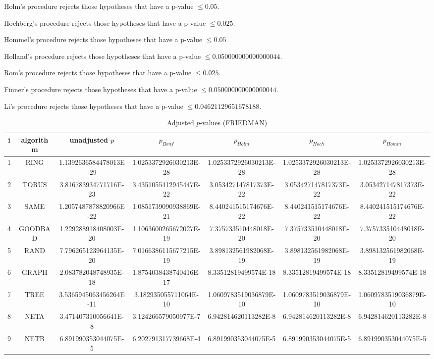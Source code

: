 \documentclass[a4paper,10pt]{article}
\begin{document}
\begin{landscape}
Holm's procedure rejects those hypotheses that have a p-value $\le0.05$.


Hochberg's procedure rejects those hypotheses that have a p-value $\le0.025$.


Hommel's procedure rejects those hypotheses that have a p-value $\le0.05$.


Holland's procedure rejects those hypotheses that have a p-value $\le0.050000000000000044$.


Rom's procedure rejects those hypotheses that have a p-value $\le0.025$.


Finner's procedure rejects those hypotheses that have a p-value $\le0.050000000000000044$.


Li's procedure rejects those hypotheses that have a p-value $\le0.04621129651678188$.



\newpage

\begin{table}[!htp]
\centering\scriptsize
\caption{Adjusted $p$-values (FRIEDMAN)}
\begin{tabular}{ccccccc}
i&algorithm&unadjusted $p$&$p_{Bonf}$&$p_{Holm}$&$p_{Hoch}$&$p_{Homm}$\\
\hline
1& RING&1.1392636584478013E-29&1.0253372926030213E-28&1.0253372926030213E-28&1.0253372926030213E-28&1.0253372926030213E-28\\
2& TORUS&3.816783934771716E-23&3.4351055412945447E-22&3.053427147817373E-22&3.053427147817373E-22&3.053427147817373E-22\\
3& SAME&1.2057487878820966E-22&1.0851739090938869E-21&8.440241515174676E-22&8.440241515174676E-22&8.440241515174676E-22\\
4& GOODBAD&1.229288918408003E-20&1.1063600265672027E-19&7.375733510448018E-20&7.375733510448018E-20&7.375733510448018E-20\\
5& RAND&7.796265123964135E-20&7.0166386115677215E-19&3.898132561982068E-19&3.898132561982068E-19&3.898132561982068E-19\\
6& GRAPH&2.083782048748935E-18&1.8754038438740416E-17&8.33512819499574E-18&8.33512819499574E-18&8.33512819499574E-18\\
7& TREE&3.5365945063456264E-11&3.182935055711064E-10&1.0609783519036879E-10&1.0609783519036879E-10&1.0609783519036879E-10\\
8& NETA&3.471407310056641E-8&3.124266579050977E-7&6.942814620113282E-8&6.942814620113282E-8&6.942814620113282E-8\\
9& NETB&6.891990353044075E-5&6.202791317739668E-4&6.891990353044075E-5&6.891990353044075E-5&6.891990353044075E-5\\
\hline
\end{tabular}
\end{table}


\end{landscape}
\end{document}
